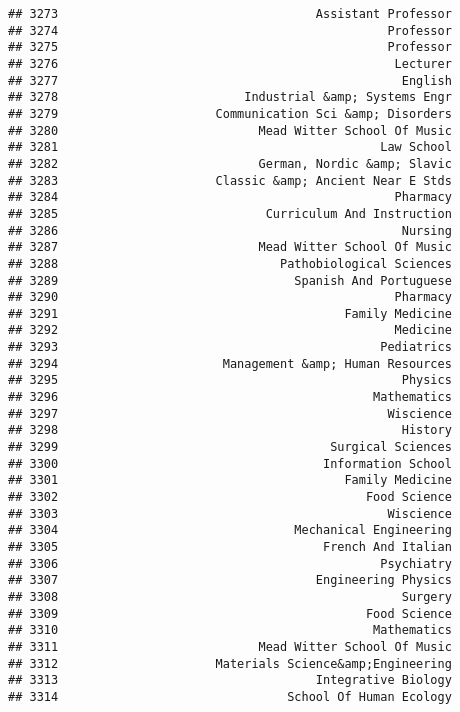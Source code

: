 \documentclass[
]{article}
\begin{document}
\begin{verbatim}
## 3273                                    Assistant Professor
## 3274                                              Professor
## 3275                                              Professor
## 3276                                               Lecturer
## 3277                                                English
## 3278                          Industrial &amp; Systems Engr
## 3279                      Communication Sci &amp; Disorders
## 3280                            Mead Witter School Of Music
## 3281                                             Law School
## 3282                            German, Nordic &amp; Slavic
## 3283                      Classic &amp; Ancient Near E Stds
## 3284                                               Pharmacy
## 3285                             Curriculum And Instruction
## 3286                                                Nursing
## 3287                            Mead Witter School Of Music
## 3288                               Pathobiological Sciences
## 3289                                 Spanish And Portuguese
## 3290                                               Pharmacy
## 3291                                        Family Medicine
## 3292                                               Medicine
## 3293                                             Pediatrics
## 3294                       Management &amp; Human Resources
## 3295                                                Physics
## 3296                                            Mathematics
## 3297                                              Wiscience
## 3298                                                History
## 3299                                      Surgical Sciences
## 3300                                     Information School
## 3301                                        Family Medicine
## 3302                                           Food Science
## 3303                                              Wiscience
## 3304                                 Mechanical Engineering
## 3305                                     French And Italian
## 3306                                             Psychiatry
## 3307                                    Engineering Physics
## 3308                                                Surgery
## 3309                                           Food Science
## 3310                                            Mathematics
## 3311                            Mead Witter School Of Music
## 3312                      Materials Science&amp;Engineering
## 3313                                    Integrative Biology
## 3314                                School Of Human Ecology

\end{verbatim}
\end{document}

